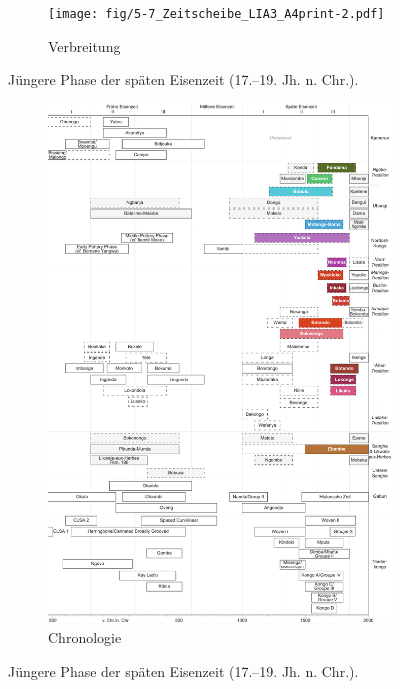 \begin{figure}[p]
	\centering
	\begin{subfigure}[b]{\textwidth}
		\centering
		\texttt{[image: fig/5-7\_Zeitscheibe\_LIA3\_A4print-2.pdf]}
		\vspace{4cm}
		\caption{Verbreitung}
		\label{fig:LIA3_Karte}
	\end{subfigure}
	\caption{Jüngere Phase der späten Eisenzeit (17.--19. Jh. n. Chr.).}
\end{figure}
\addtocounter{figure}{-1}
\begin{figure}[p]
	\begin{subfigure}[b]{\textwidth}
		\setcounter{subfigure}{1}
		\centering
		\includegraphics[height = .9\textheight]{fig/Chronologiesystem_v4_Zeitscheibe_LIA3.pdf}
		\caption{Chronologie}
		\label{fig:LIA3_Chronologie}
	\end{subfigure}
	\caption{Jüngere Phase der späten Eisenzeit (17.--19. Jh. n. Chr.).}
	\label{fig:LIA3}
\end{figure}


